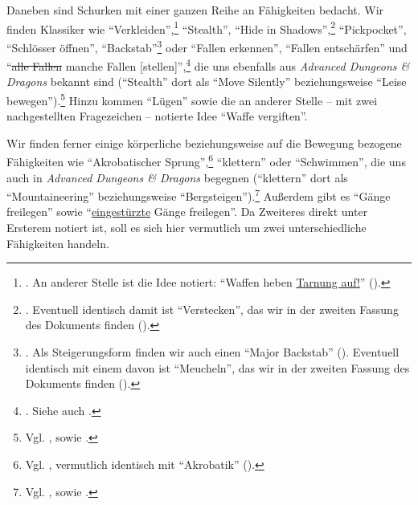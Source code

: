 \documentclass[a5paper,pagesize,numbers=noenddot]{scrbook}
\begin{document}
Daneben sind Schurken mit einer ganzen Reihe an Fähigkeiten bedacht.
Wir finden Klassiker wie \enquote{Verkleiden},\footnote{\autocite[S.~5]{orpheus_gildensystem}. An anderer Stelle ist die Idee notiert: \enquote{Waffen heben \uline{Tarnung auf!}} (\autocite[S.~18]{orpheus_b_scribbles}).} \enquote{Stealth},\autocite[S.~5]{orpheus_gildensystem} \enquote{Hide in Shadows},\footnote{\autocite[S.~5]{orpheus_gildensystem}. Eventuell identisch damit ist \enquote{Verstecken}, das wir in der zweiten Fassung des Dokuments finden (\autocite[S.~3]{orpheus_gildensystem_v2}).} \enquote{Pickpocket},\autocite[S.~9]{orpheus_gildensystem} \enquote{Schlösser öffnen},\autocite[S.~9]{orpheus_gildensystem} \enquote{Backstab}\footnote{\autocite[S.~5]{orpheus_gildensystem}. Als Steigerungsform finden wir auch einen \enquote{Major Backstab} (\autocite[S.~1]{orpheus_gildensystem}). Eventuell identisch mit einem davon ist \enquote{Meucheln}, das wir in der zweiten Fassung des Dokuments finden (\autocite[S.~1, 3]{orpheus_gildensystem_v2}).} oder \enquote{Fallen erkennen}, \enquote{Fallen entschärfen}\autocite[S.~9]{orpheus_gildensystem} und \enquote{\sout{alle Fallen} manche Fallen [stellen]},\footnote{\autocite[S.~13]{orpheus_gildensystem}. Siehe auch \autocite[S.~15]{orpheus_gildensystem}.} die uns ebenfalls aus \textit{Advanced Dungeons \& Dragons} bekannt sind (\enquote{Stealth} dort als \enquote{Move Silently} beziehungsweise \enquote{Leise bewegen}).\footnote{Vgl. \autocite[S.~39\,f., 58, 63]{cook_adnd_1989}, sowie \autocite[S.~56\,ff., 80, 86]{cook_adnd_1996}.}
Hinzu kommen \enquote{Lügen}\autocite[S.~5]{orpheus_gildensystem} sowie die an anderer Stelle -- mit zwei nachgestellten Fragezeichen -- notierte Idee \enquote{Waffe vergiften}.\autocite[S.~8]{orpheus_b_scribbles}

Wir finden ferner einige körperliche beziehungsweise auf die Bewegung bezogene Fähigkeiten wie \enquote{Akrobatischer Sprung},\footnote{Vgl. \autocite[S.~9]{orpheus_gildensystem}, vermutlich identisch mit \enquote{Akrobatik} (\autocite[S.~14]{orpheus_b_scribbles}).} \enquote{klettern}\autocite[S.~9]{orpheus_gildensystem} oder \enquote{Schwimmen}, \autocite[S.~14]{orpheus_b_scribbles} die uns auch in \textit{Advanced Dungeons \& Dragons} begegnen (\enquote{klettern} dort als \enquote{Mountaineering} beziehungsweise \enquote{Bergsteigen}).\footnote{Vgl. \autocite[S.~61, 64]{cook_adnd_1989}, sowie \autocite[S.~79, 83\,f.]{cook_adnd_1996}.}
Außerdem gibt es \enquote{Gänge freilegen} sowie \enquote{\uline{eingestürzte} Gänge freilegen}.\autocite[S.~5]{orpheus_gildensystem}
Da Zweiteres direkt unter Ersterem notiert ist, soll es sich hier vermutlich um zwei unterschiedliche Fähigkeiten handeln.
\end{document}
